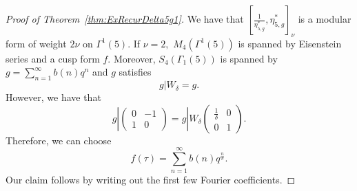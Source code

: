 \documentclass[10pt]{amsart}
\theoremstyle{definition}
\theoremstyle{remark}
\numberwithin{equation}{section}
\begin{document}
	\begin{proof}[Proof of Theorem~\ref{thm:ExRecurDelta5g1}]
		We have that $[\frac{1}{\eta_{5,g}^\ast},\eta_{5,g}^\ast]_\nu$ is a modular form of weight $2\nu$ on $\Gamma^1(5).$ If $\nu=2,$ $M_4(\Gamma^1(5))$ is spanned by Eisenstein series and a cusp form $f.$ Moreover, $S_4(\Gamma_1(5))$ is spanned by $g=\sum\limits_{n=1}^\infty b(n)q^n$ and $g$ satisfies
		$$
		g|W_\delta = g.
		$$
		However, we have that
		$$
		g|\begin{pmatrix}
			0 & -1 \\
			1 & 0
		\end{pmatrix}=g|W_\delta\begin{pmatrix}
		\frac{1}{\delta} & 0 \\
		0 & 1
		\end{pmatrix}.
		$$
		Therefore, we can choose
		$$
		f(\tau)=\sum\limits_{n=1}^{\infty} b(n)q^{\frac{n}{\delta}}.
		$$
		Our claim follows by writing out the first few Fourier coefficients.
	\end{proof}
	
\end{document}
